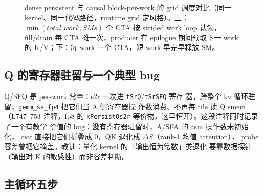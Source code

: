 \begin{figure}[H]
\caption{dense persistent 与 causal block-per-work 的 grid 调度对比（同一
kernel、同一代码路径，runtime grid 定风格）。上：$\min(total\_work,SMs)$ 个 CTA
按 strided work loop 认领，fill/drain 每 CTA 摊一次，producer 在 epilogue
期间预取下一 work 的 K/V；下：每 work 一个 CTA，短 work 早完早释放 SM。}
\label{fig:32-grid-sched}
\end{figure}

\subsection{Q 的寄存器驻留与一个典型 bug}

Q/SFQ 是 per-work 常量：s2r 一次进 \texttt{tSrQ}/\texttt{tSrSFQ} 寄存
器，跨整个 kv 循环驻留，\texttt{gemm\_ss\_fp4} 把它们当 A 侧寄存器操
作数消费、不再每 tile 读 Q smem（L747--753 注释，fp8 的
\texttt{kPersistQs2r} 等价物，这里恒开）。这段注释同时记录了一个有教学
价值的 bug：\textbf{没有}寄存器驻留时，A/SFA 的 asm 操作数未初始化，
cicc 直接把它们折叠成 0，QK 退化成 $\Delta S$（rank-1 均值 attention），
probe 容差曾把它掩盖。教训：量化 kernel 的「输出恒为常数」类退化
要靠数据探针（输出对 K 的敏感性）而非容差判断。

\subsection{主循环五步}

